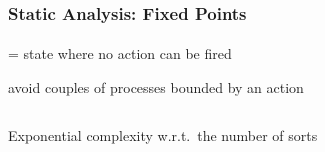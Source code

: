 
\begin{frame}[c]
  \frametitle{Static Analysis: Fixed Points}
  \framesubtitle{\tcite{\cpmrtcsb}}

 = state where no action can be fired
\begin{fleches}
  \item avoid couples of processes bounded by an action
\end{fleches}

\bigskip
\begin{columns}
\begin{column}{0.5\textwidth}

\begin{center}
\scalebox{0.7}{
\begin{tikzpicture}
\exdefb
\exdefbfrappes
\end{tikzpicture}
}
\end{center}

\end{column}
\begin{column}{0.5\textwidth}


\end{column}
\end{columns}

\bigskip
\pause[6]
Exponential complexity w.r.t.~the number of sorts

\end{frame}
